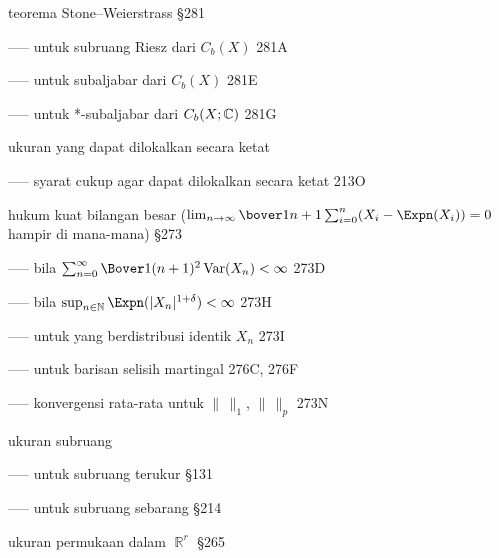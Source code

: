 















teorema Stone--Weierstrass \S281

----- untuk subruang Riesz dari $C_b(X)$ 281A

----- untuk subaljabar dari $C_b(X)$ 281E

----- untuk *-subaljabar dari $C_b(X;\Bbb C)$ 281G



 ukuran yang dapat dilokalkan secara ketat

----- syarat cukup agar dapat dilokalkan secara ketat 213O



 hukum kuat bilangan besar ($\lim_{n\to\infty}\bover1{n+1}\sum_{i=0}^n(X_i-\Expn(X_i))=0$ hampir di mana-mana) \S273


----- bila $\sum_{n=0}^{\infty}\Bover1{(n+1)^2}\Var(X_n)<\infty$ 273D


----- bila $\sup_{n\in\Bbb N}\Expn(|X_n|^{1+\delta})<\infty$ 273H


----- untuk yang berdistribusi identik $X_n$ 273I

----- untuk barisan selisih martingal 276C, 276F

----- konvergensi rata-rata untuk $\|\,\|_1$, $\|\,\|_p$ 273N
















 ukuran subruang

----- untuk subruang terukur \S131

----- untuk subruang sebarang \S214




 ukuran permukaan dalam $\BbbR^r$ \S265







\indexmedskip











